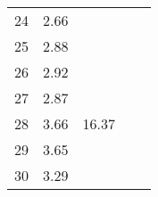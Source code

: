 \begin{center}
\begin{tabular}{| l || c | c | c | c |}
24 & \multirow{1}{*}{ 2.66 }  & & & \\\cline{2-2}
25 & \multirow{1}{*}{ 2.88 }  & & & \\\cline{2-2}\cline{3-3}
26 & \multirow{1}{*}{ 2.92 }  & \multirow{5}{*}{ 16.37 }  & & \\\cline{2-2}
27 & \multirow{1}{*}{ 2.87 }  & & & \\\cline{2-2}
28 & \multirow{1}{*}{ 3.66 }  & & & \\\cline{2-2}
29 & \multirow{1}{*}{ 3.65 }  & & & \\\cline{2-2}
30 & \multirow{1}{*}{ 3.29 }  & & & \\\cline{2-2}\cline{3-3}\cline{4-4}\cline{5-5}
\hline\end{tabular}
\end{center}